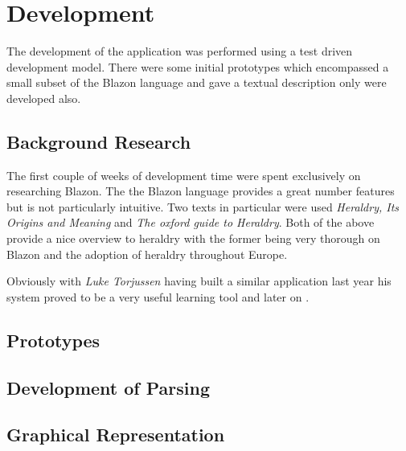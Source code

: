 \chapter{Development}

The development of the application was performed using a test driven development model.  There were some initial prototypes which encompassed a small subset of the Blazon language and gave a textual description only were developed also. 


\section{Background Research}
The first couple of weeks of development time were spent exclusively on researching Blazon.  The the Blazon language provides a great number features  but is not particularly intuitive.  Two texts in particular were used \emph{ Heraldry, Its Origins and Meaning}\cite{bob} and \emph{The oxford guide to Heraldry}\cite{oxford}.  Both of the above provide a nice overview to heraldry with the former being very thorough on Blazon and the adoption of heraldry throughout Europe. 

Obviously with \emph{Luke Torjussen} having built a similar application\cite{luke} last year his system proved to be a very useful learning tool and later on  .  


\section{Prototypes}

\section{Development of Parsing}

\section{Graphical Representation}

